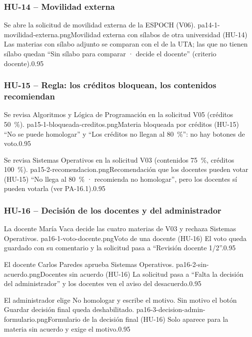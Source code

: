 \subsubsection{HU-14 -- Movilidad externa}

{Se abre la solicitud de movilidad externa de la ESPOCH (V06).}
{pa14-1-movilidad-externa.png}{Movilidad externa con sílabos de otra universidad (HU-14)}
{Las materias con sílabo adjunto se comparan con el de la UTA; las que no tienen sílabo quedan ``Sin sílabo para
comparar · decide el docente'' (criterio docente).}{0.95}

\subsubsection{HU-15 -- Regla: los créditos bloquean, los contenidos recomiendan}

{Se revisa Algoritmos y Lógica de Programación en la solicitud V05 (créditos 50~\%).}
{pa15-1-bloqueada-creditos.png}{Materia bloqueada por créditos (HU-15)}
{``No se puede homologar'' y ``Los créditos no llegan al 80~\%'': no hay botones de voto.}{0.95}

{Se revisa Sistemas Operativos en la solicitud V03 (contenidos 75~\%, créditos 100~\%).}
{pa15-2-recomendacion.png}{Recomendación que los docentes pueden votar (HU-15)}
{``No llega al 80~\% · recomienda no homologar'', pero los docentes sí pueden votarla (ver PA-16.1).}{0.95}

\subsubsection{HU-16 -- Decisión de los docentes y del administrador}

{La docente María Vaca decide las cuatro materias de V03 y rechaza Sistemas Operativos.}
{pa16-1-voto-docente.png}{Voto de una docente (HU-16)}
{El voto queda guardado con su comentario y la solicitud pasa a ``Revisión docente 1/2''.}{0.95}

{El docente Carlos Paredes aprueba Sistemas Operativos.}
{pa16-2-sin-acuerdo.png}{Docentes sin acuerdo (HU-16)}
{La solicitud pasa a ``Falta la decisión del administrador'' y los docentes ven el aviso del desacuerdo.}{0.95}

{El administrador elige No homologar y escribe el motivo. Sin motivo el botón Guardar decisión final queda deshabilitado.}
{pa16-3-decision-admin-formulario.png}{Formulario de la decisión final (HU-16)}
{Solo aparece para la materia sin acuerdo y exige el motivo.}{0.95}

